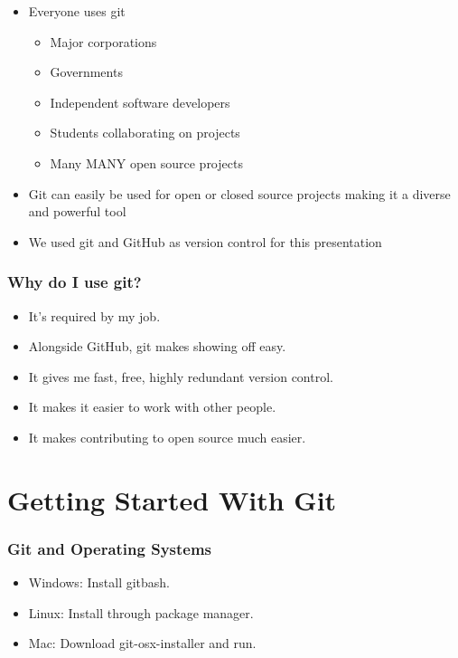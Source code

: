 \documentclass[unknownkeysallowed]{beamer}
\begin{document}
\begin{frame}
\begin{figure}
\begin{center}
                \end{center}
            \endminipage
        \end{figure}
    \begin{itemize}
        \item{Everyone uses git}
            \begin{itemize}
                \item{Major corporations}
                \item{Governments}
                \item{Independent software developers}
                \item{Students collaborating on projects}
                \item{Many MANY open source projects}
           \end{itemize}
        \item{Git can easily be used for open or closed source projects making it a diverse and powerful tool}
        \item{We used git and GitHub as version control for this presentation}
    \end{itemize}
    \vspace{1cm} %
\end{frame}

\begin{frame}
    \frametitle{Why do I use git?}
    \begin{itemize}
        \item{It's required by my job.}
        \item{Alongside GitHub, git makes showing off easy.}
        \item{It gives me fast, free, highly redundant version control.}
        \item{It makes it easier to work with other people.}
        \item{It makes contributing to open source much easier.}
    \end{itemize}
    \vspace{1cm} %
\end{frame}

\section{Getting Started With Git}
\begin{frame}
    \frametitle{Git and Operating Systems}
    \begin{itemize}
        \item{Windows: Install gitbash.}
        \item{Linux: Install through package manager.}
        \item{Mac: Download git-osx-installer and run. }
    \end{itemize}
    \vspace{1cm} %
\end{frame}
\end{document}
